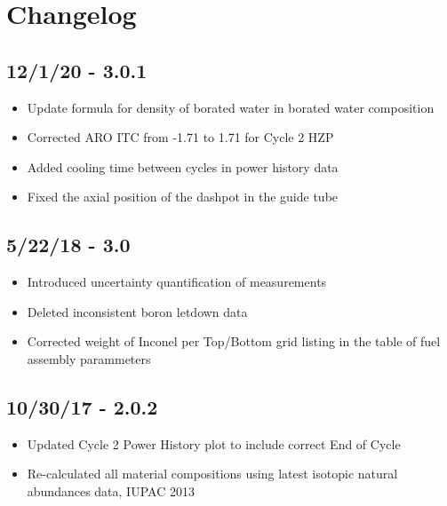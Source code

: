 \section*{Changelog}

\subsection*{12/1/20 - 3.0.1}
\begin{itemize}
  \item Update formula for density of borated water in borated water composition
  \item Corrected ARO ITC from -1.71 to 1.71 for Cycle 2 HZP
  \item Added cooling time between cycles in power history data
  \item Fixed the axial position of the dashpot in the guide tube
\end{itemize}

\subsection*{5/22/18 - 3.0}
\begin{itemize}
  \item Introduced uncertainty quantification of measurements
  \item Deleted inconsistent boron letdown data
  \item Corrected weight of Inconel per Top/Bottom grid listing in the table of
        fuel assembly parammeters
\end{itemize}

\subsection*{10/30/17 - 2.0.2}
\begin{itemize}
  \item Updated Cycle 2 Power History plot to include correct End of Cycle
  \item Re-calculated all material compositions using latest isotopic natural
        abundances data, IUPAC 2013
\end{itemize}

